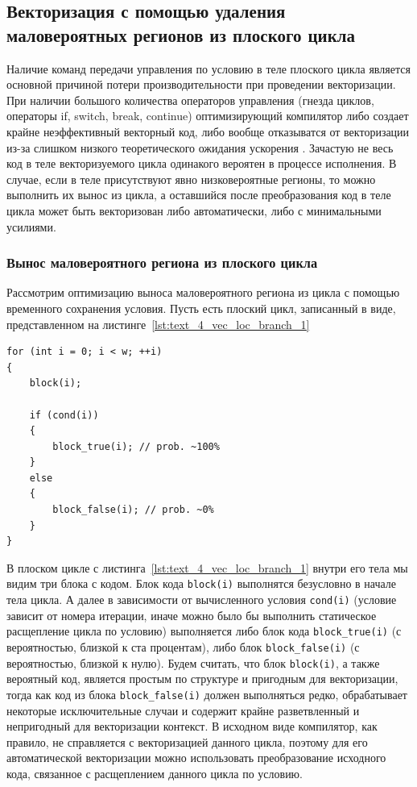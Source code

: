 \subsection{Векторизация с помощью удаления маловероятных регионов из плоского цикла}\label{sec:text_4_loc_branch}

Наличие команд передачи управления по условию в теле плоского цикла является основной причиной потери производительности при проведении векторизации.
При наличии большого количества операторов управления (гнезда циклов, операторы if, switch, break, continue) оптимизирующий компилятор либо создает крайне неэффективный векторный код, либо вообще отказыватся от векторизации из-за слишком низкого теоретического ожидания ускорения \cite{Rybakov2018VecBranch}.
Зачастую не весь код в теле векторизуемого цикла одинакого вероятен в процессе исполнения.
В случае, если в теле присутствуют явно низковероятные регионы, то можно выполнить их вынос из цикла, а оставшийся после преобразования код в теле цикла может быть векторизован либо автоматически, либо с минимальными усилиями.

\subsubsection{Вынос маловероятного региона из плоского цикла}

Рассмотрим оптимизацию выноса маловероятного региона из цикла с помощью временного сохранения условия.
Пусть есть плоский цикл, записанный в виде, представленном на листинге~\ref{lst:text_4_vec_loc_branch_1}

\begin{lstlisting}[caption={Плоский цикл с маловероятным регионом.},label={lst:text_4_vec_loc_branch_1}]
for (int i = 0; i < w; ++i)
{
    block(i);
    
    if (cond(i))
    {
        block_true(i); // prob. ~100%
    }
    else
    {
        block_false(i); // prob. ~0%
    }
}
\end{lstlisting}

В плоском цикле с листинга~\ref{lst:text_4_vec_loc_branch_1} внутри его тела мы видим три блока с кодом.
Блок кода \texttt{block(i)} выполнятся безусловно в начале тела цикла.
А далее в зависимости от вычисленного условия \texttt{cond(i)} (условие зависит от номера итерации, иначе можно было бы выполнить статическое расщепление цикла по условию) выполняется либо блок кода \texttt{block\_true(i)} (с вероятностью, близкой к ста процентам), либо блок \texttt{block\_false(i)} (с вероятностью, близкой к нулю).
Будем считать, что блок \texttt{block(i)}, а также вероятный код, является простым по структуре и пригодным для векторизации, тогда как код из блока \texttt{block\_false(i)} должен выполняться редко, обрабатывает некоторые исключительные случаи и содержит крайне разветвленный и непригодный для векторизации контекст.
В исходном виде компилятор, как правило, не справляется с векторизацией данного цикла, поэтому для его автоматической векторизации можно использовать преобразование исходного кода, связанное с расщеплением данного цикла по условию.

